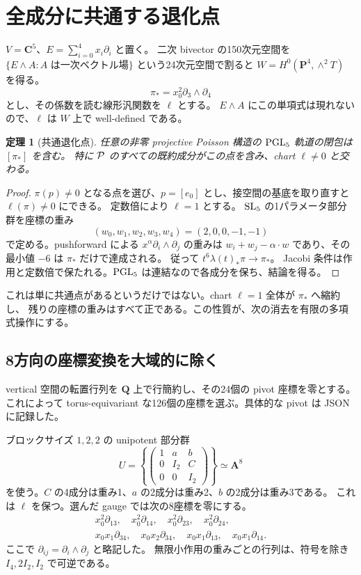 \documentclass[11pt,a4paper]{ltjsarticle}
\newcommand{\PP}{\mathbf P}\renewcommand{\AA}{\mathbf A}\newcommand{\CC}{\mathbf C}\newcommand{\QQ}{\mathbf Q}
\newtheorem{theorem}{定理}[section]\newtheorem{proposition}[theorem]{命題}\newtheorem{lemma}[theorem]{補題}\newtheorem{corollary}[theorem]{系}
\theoremstyle{remark}\newtheorem{remark}[theorem]{注意}\renewcommand{\proofname}{証明}
\begin{document}
\section{全成分に共通する退化点}
$V=\CC^5$、$E=\sum_{i=0}^4x_i\partial_i$ と置く。
二次 bivector の150次元空間を
$\{E\wedge A:A\text{ は一次ベクトル場}\}$ という24次元空間で割ると
$W=H^0(\PP^4,\wedge^2T)$ を得る。
\[
 \pi_*=x_0^2\partial_3\wedge\partial_4
\]
とし、その係数を読む線形汎関数を $\ell$ とする。
$E\wedge A$ にこの単項式は現れないので、$\ell$ は $W$ 上で well-defined である。

\begin{theorem}[共通退化点]
任意の非零 projective Poisson 構造の $\operatorname{PGL}_5$ 軌道の閉包は $[\pi_*]$ を含む。
特に $\mathcal P$ のすべての既約成分がこの点を含み、chart $\ell\ne0$ と交わる。
\end{theorem}
\begin{proof}
$\pi(p)\ne0$ となる点を選び、$p=[e_0]$ とし、接空間の基底を取り直すと $\ell(\pi)\ne0$ にできる。
定数倍により $\ell=1$ とする。
$\operatorname{SL}_5$ の1パラメータ部分群を座標の重み
\[
 (w_0,w_1,w_2,w_3,w_4)=(2,0,0,-1,-1)
\]
で定める。pushforward による $x^\alpha\partial_i\wedge\partial_j$ の重みは
$w_i+w_j-\alpha\cdot w$ であり、その最小値 $-6$ は $\pi_*$ だけで達成される。
従って $t^6\lambda(t)_*\pi\to\pi_*$。
Jacobi 条件は作用と定数倍で保たれる。$\operatorname{PGL}_5$ は連結なので各成分を保ち、結論を得る。
\end{proof}

これは単に共通点があるというだけではない。chart $\ell=1$ 全体が $\pi_*$ へ縮約し、
残りの座標の重みはすべて正である。この性質が、次の消去を有限の多項式操作にする。

\subsection{8方向の座標変換を大域的に除く}
vertical 空間の転置行列を $\QQ$ 上で行簡約し、その24個の pivot 座標を零とする。
これによって torus-equivariant な126個の座標を選ぶ。具体的な pivot は JSON に記録した。

ブロックサイズ $1,2,2$ の unipotent 部分群
\[
 U=\left\{\begin{pmatrix}1&a&b\\0&I_2&C\\0&0&I_2\end{pmatrix}\right\}\simeq\AA^8
\]
を使う。$C$ の4成分は重み1、$a$ の2成分は重み2、$b$ の2成分は重み3である。
これは $\ell$ を保つ。選んだ gauge では次の8座標を零にする。
\[
\begin{gathered}
 x_0^2\partial_{13},\quad x_0^2\partial_{14},\quad
 x_0^2\partial_{23},\quad x_0^2\partial_{24},\\
 x_0x_1\partial_{34},\quad x_0x_2\partial_{34},\quad
 x_0x_1\partial_{13},\quad x_0x_1\partial_{14}.
\end{gathered}
\]
ここで $\partial_{ij}=\partial_i\wedge\partial_j$ と略記した。
無限小作用の重みごとの行列は、符号を除き $I_4,2I_2,I_2$ で可逆である。
\end{document}

